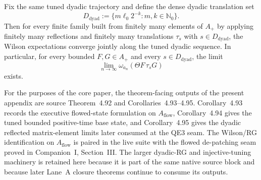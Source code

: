 \documentclass[preprint,aip,jmp,amsmath,amssymb,nofootinbib]{revtex4-2}
\begin{document}
\begin{corollary}
Fix the same tuned dyadic trajectory and define the dense dyadic translation set
\[
D_{\mathrm{dyad}}:=\{m\ell_0 2^{-k}: m,k\in\mathbb N_0\}.
\]
Then for every finite family built from finitely many elements of $A_+$ by applying finitely many reflections and finitely many translations $\tau_s$ with $s\in D_{\mathrm{dyad}}$, the Wilson expectations converge jointly along the tuned dyadic sequence. In particular, for every bounded $F,G\in A_+$ and every $s\in D_{\mathrm{dyad}}$, the limit
\[
\lim_{n\to\infty}\omega_{a_n}(\Theta F\,\tau_s G)
\]
exists.
\end{corollary}

\begin{remark}
For the purposes of the core paper, the theorem-facing outputs of the present appendix are source Theorem~4.92 and Corollaries~4.93--4.95. Corollary~4.93 records the executive flowed-state formulation on $A_{\mathrm{flow}}$, Corollary~4.94 gives the tuned bounded positive-time base state, and Corollary~4.95 gives the dyadic reflected matrix-element limits later consumed at the QE3 seam. The Wilson/RG identification on $A_{\mathrm{flow}}$ is paired in the live suite with the flowed de-patching seam proved in Companion~I, Section~III. The larger dyadic-RG and injective-tuning machinery is retained here because it is part of the same native source block and because later Lane~A closure theorems continue to consume its outputs.
\end{remark}










\end{document}
